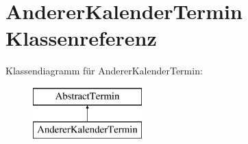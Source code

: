 \hypertarget{class_anderer_kalender_termin}{}\section{Anderer\+Kalender\+Termin Klassenreferenz}
\label{class_anderer_kalender_termin}
Klassendiagramm für Anderer\+Kalender\+Termin\+:\begin{figure}[H]
\begin{center}
\leavevmode
\includegraphics[height=2.000000cm]{class_anderer_kalender_termin}
\end{center}
\end{figure}
